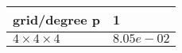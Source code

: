 \begin{tabular}{ll}
\hline
 grid/degree p         & 1          \\
\hline
 $4 \times 4 \times 4$ & $8.05e-02$ \\
\hline
\end{tabular}